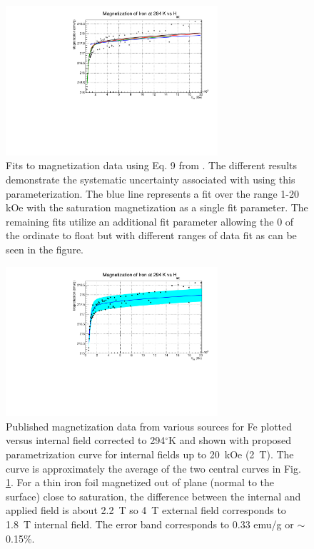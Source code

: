 \documentclass[12pt]{article}
\begin{document}
\begin{figure}
\centering
\includegraphics[width=0.7\textwidth]{FeCombinedFit_vs_Hint.pdf}
\caption{Fits to magnetization data using Eq. 9 from \cite{PauthenetMar1982}. The different results demonstrate the systematic uncertainty associated with using this parameterization. The blue line represents a fit over the range 1-20 kOe with the saturation magnetization as a single fit parameter. The remaining fits utilize an additional fit parameter allowing the 0 of the ordinate to float but with different ranges of data fit as can be seen in the figure.}
\label{fig:mag_fit_Fe}
\end{figure}
\begin{figure}
\centering
\includegraphics[width=0.7\textwidth]{FeCombinedFitErrorBand_vs_Hint.pdf}
\caption{Published magnetization data from various sources for Fe plotted versus internal field corrected to 294$^{\circ}$K and shown with proposed parametrization curve for internal fields up to 20~kOe (2~T). The curve is approximately the average of the two central curves in Fig. \ref{fig:mag_fit_Fe}. For a thin iron foil magnetized out of plane (normal to the surface) close to saturation, the difference between the internal and applied field is about 2.2~T so 4~T external field corresponds to 1.8~T internal field. The error band corresponds to 0.33 emu/g or $\sim$0.15\%. }
\label{fig:mag_errorband_Fe}
\end{figure}
\end{document}
